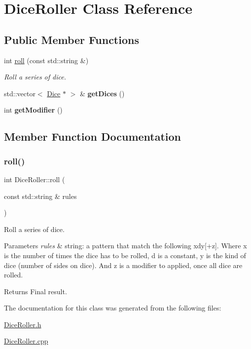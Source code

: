 \hypertarget{class_dice_roller}{}\section{Dice\+Roller Class Reference}
\label{class_dice_roller}
\subsection*{Public Member Functions}
\begin{DoxyCompactItemize}
\item 
int \hyperlink{class_dice_roller_ac4af563d61e9fbc000b88081a8da3fee}{roll} (const std\+::string \&)
\begin{DoxyCompactList}\small\item\em Roll a series of dice. \end{DoxyCompactList}\item 
\hypertarget{class_dice_roller_aed8245bbdff7ebaf1946cbcdd44a76b2}{}\label{class_dice_roller_aed8245bbdff7ebaf1946cbcdd44a76b2} 
std\+::vector$<$ \hyperlink{class_dice}{Dice} $\ast$ $>$ \& {\bfseries get\+Dices} ()
\item 
\hypertarget{class_dice_roller_a2e5652cc8b7f4ef78ef075e159bfd9ba}{}\label{class_dice_roller_a2e5652cc8b7f4ef78ef075e159bfd9ba} 
int {\bfseries get\+Modifier} ()
\end{DoxyCompactItemize}


\subsection{Member Function Documentation}
\hypertarget{class_dice_roller_ac4af563d61e9fbc000b88081a8da3fee}{}\label{class_dice_roller_ac4af563d61e9fbc000b88081a8da3fee} 
\subsubsection{\texorpdfstring{roll()}{roll()}}
{\footnotesize\ttfamily int Dice\+Roller\+::roll (\begin{DoxyParamCaption}\item[{const std\+::string \&}]{rules }\end{DoxyParamCaption})}



Roll a series of dice. 


\begin{DoxyParams}{Parameters}
{\em rules} & string\+: a pattern that match the following {\ttfamily xdy\mbox{[}+z\mbox{]}}. Where x is the number of times the dice has to be rolled, d is a constant, y is the kind of dice (number of sides on dice). And z is a modifier to applied, once all dice are rolled.\\
\hline
\end{DoxyParams}
\begin{DoxyReturn}{Returns}
Final result. 
\end{DoxyReturn}


The documentation for this class was generated from the following files\+:\begin{DoxyCompactItemize}
\item 
\hyperlink{_dice_roller_8h}{Dice\+Roller.\+h}\item 
\hyperlink{_dice_roller_8cpp}{Dice\+Roller.\+cpp}\end{DoxyCompactItemize}
